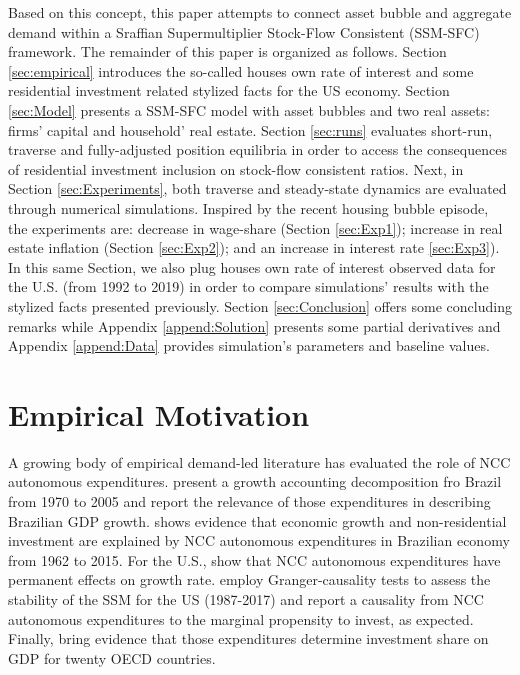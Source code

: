 \documentclass[11pt]{article}
\begin{document}
Based on this concept, this paper attempts to connect asset bubble and aggregate demand within a Sraffian Supermultiplier Stock-Flow Consistent (SSM-SFC) framework. 
The remainder of this paper is organized as follows.
Section \ref{sec:empirical} introduces the so-called houses own rate of interest and some residential investment related stylized facts for the US economy.
Section \ref{sec:Model} presents a SSM-SFC model  with asset bubbles and two real assets: firms' capital and household' real estate. 
Section \ref{sec:runs} evaluates short-run, traverse and fully-adjusted position equilibria in order to access the consequences of residential investment inclusion on stock-flow consistent ratios.
Next, in Section \ref{sec:Experiments}, both traverse and steady-state dynamics are evaluated through numerical simulations.
Inspired by the recent housing bubble episode, the experiments are: decrease in wage-share (Section \ref{sec:Exp1}); increase in real estate inflation (Section \ref{sec:Exp2}); and an increase in interest rate \ref{sec:Exp3}).
In this same Section, we also plug houses own rate of interest observed data for the U.S. (from 1992 to 2019) in order to compare simulations' results with the stylized facts presented previously.
Section \ref{sec:Conclusion} offers some concluding remarks while Appendix \ref{append:Solution} presents some partial derivatives and Appendix \ref{append:Data} provides simulation's parameters and baseline values.



\section{Empirical Motivation}
\label{sec:org2a3b222}
\label{sec:empirical}
A growing body of empirical demand-led literature has evaluated the role of NCC autonomous expenditures.
\textcite{freitas_pattern_2013} present a growth accounting decomposition fro Brazil from 1970 to 2005 and report the relevance of those expenditures in describing Brazilian GDP growth. \textcite{braga_investment_2018} shows evidence that economic growth and non-residential investment are explained by NCC autonomous expenditures in Brazilian economy from 1962 to 2015. For the U.S., \textcite{girardi_long-run_2016} show that NCC autonomous expenditures have permanent effects on growth rate. 
\textcite{haluska_growth_2019} employ Granger-causality tests to assess the stability of the SSM for the US (1987-2017) and report a causality from NCC autonomous expenditures to the marginal propensity to invest, as expected.
Finally, \textcite{girardi_autonomous_2018} bring evidence that those expenditures determine investment share on GDP for twenty OECD countries.
\end{document}
